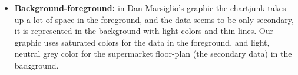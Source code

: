 \begin{itemize}
	\item \textbf{Background-foreground:} in Dan Marsiglio's graphic the chartjunk takes up a lot of space in the foreground, and the data seems to be only secondary, it is represented in the background with light colors and thin lines. Our graphic uses saturated colors for the data in the foreground, and light, neutral grey color for the supermarket floor-plan (the secondary data) in the background.
\end{itemize}





